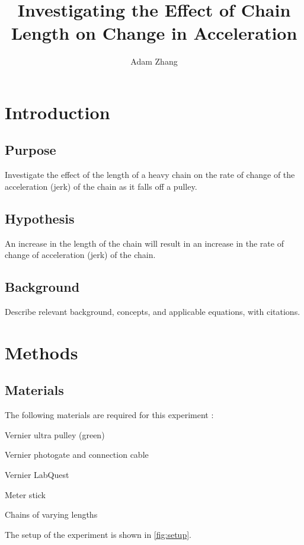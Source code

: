 \documentclass[stu,biblatex,floatsintext,draftall]{apa7}
\title{Investigating the Effect of Chain Length on Change in Acceleration}
\author{Adam Zhang}
\affiliation{Academies of Loudoun}
\begin{document}
\maketitle
\tableofcontents
\newpage

\section{Introduction}

\subsection{Purpose}
Investigate the effect of the length of a heavy chain on the rate of change of the acceleration (jerk) of the chain as it falls off a pulley.

\subsection{Hypothesis}
An increase in the length of the chain will result in an increase in the rate of change of acceleration (jerk) of the chain.

\subsection{Background}
Describe relevant background, concepts, and applicable equations, with citations.

\section{Methods}

\subsection{Materials}
The following materials are required for this experiment \parencite{Hilsdorf2023AtwoodsHeavyChainHandout}:
\begin{APAitemize}
	\item Vernier ultra pulley (green)
	\item Vernier photogate and connection cable
	\item Vernier LabQuest
	\item Meter stick
	\item Chains of varying lengths %
\end{APAitemize}
The setup of the experiment is shown in \autoref{fig:setup}.
\end{document}
